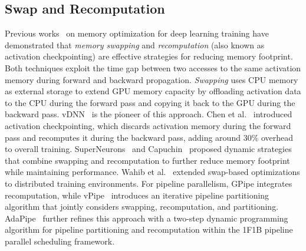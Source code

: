 \subsection{Swap and Recomputation}
Previous works~\cite{rhuVDNNVirtualizedDeep2016,chenTrainingDeepNets2016,wangSuperneuronsDynamicGPU2018,pengCapuchinTensorbasedGPU2020}
on memory optimization for deep learning training have demonstrated that \emph{memory swapping} and \emph{recomputation}
(also known as activation checkpointing) are effective strategies for reducing memory footprint.
Both techniques exploit the time gap between two accesses to the same activation memory during forward and backward propagation.
\emph{Swapping} uses CPU memory as external storage to extend GPU memory capacity
by offloading activation data to the CPU during the forward pass and copying it back to the GPU during the backward pass.
vDNN~\cite{rhuVDNNVirtualizedDeep2016} is the pioneer of this approach.
Chen et al.~\cite{chenTrainingDeepNets2016} introduced activation checkpointing,
which discards activation memory during the forward pass and recomputes it during the backward pass,
adding around 30\% overhead to overall training.
SuperNeurons~\cite{wangSuperneuronsDynamicGPU2018} and Capuchin~\cite{pengCapuchinTensorbasedGPU2020}
proposed dynamic strategies that combine swapping and recomputation to further
reduce memory footprint while maintaining performance.
Wahib et al.~\cite{wahibScalingDistributedDeep2020} extended swap-based optimizations to distributed training environments.
For pipeline parallelism, GPipe integrates recomputation, while vPipe~\cite{zhaoVPipeVirtualizedAcceleration2022}
introduces an iterative pipeline partitioning algorithm that jointly considers swapping, recomputation, and partitioning.
AdaPipe~\cite{sunAdaPipeOptimizingPipeline2024} further refines this approach with a two-step
dynamic programming algorithm for pipeline partitioning and recomputation within the 1F1B pipeline parallel scheduling framework.
